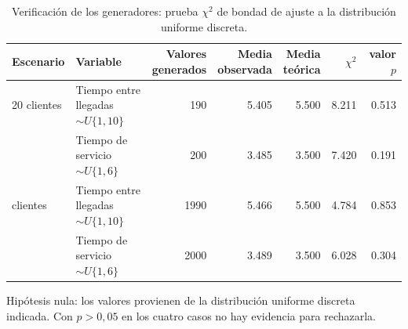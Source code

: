\begin{table}[H]
\centering
\caption{Verificaci\'on de los generadores: prueba $\chi^2$ de bondad de ajuste a la distribuci\'on uniforme discreta.}
\label{tab:valgen}
\footnotesize
\begin{tabular}{@{}llrrrrr@{}}
\toprule
Escenario & Variable & \makecell{Valores\\generados} & \makecell{Media\\observada} & \makecell{Media\\te\'orica} & $\chi^2$ & valor $p$ \\
\midrule
20 clientes & Tiempo entre llegadas $\sim U\{1,10\}$ & 190 & 5.405 & 5.500 & 8.211 & 0.513 \\
 & Tiempo de servicio $\sim U\{1,6\}$ & 200 & 3.485 & 3.500 & 7.420 & 0.191 \\
\addlinespace
200 clientes & Tiempo entre llegadas $\sim U\{1,10\}$ & 1990 & 5.466 & 5.500 & 4.784 & 0.853 \\
 & Tiempo de servicio $\sim U\{1,6\}$ & 2000 & 3.489 & 3.500 & 6.028 & 0.304 \\
\bottomrule
\end{tabular}
\begin{minipage}{\textwidth}\vspace{2pt}\footnotesize
Hip\'otesis nula: los valores provienen de la distribuci\'on uniforme discreta indicada. Con $p>0{,}05$ en los cuatro casos no hay evidencia para rechazarla.
\end{minipage}
\end{table}